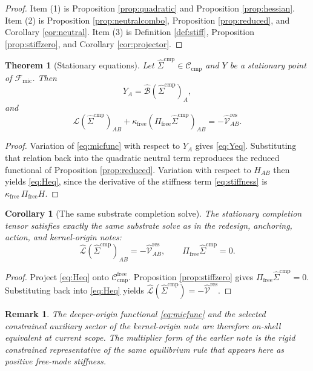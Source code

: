 \documentclass[11pt]{article}
\newcommand{\CompLift}{\widehat\Sigma^{\mathrm{cmp}}}
\newcommand{\ResidualLift}{\widehat{\mathcal V}^{\mathrm{res}}}
\newcommand{\SubGaugeVec}{\widehat{\mathcal B}}
\newcommand{\SubReducedEin}{\widehat{\mathcal L}}
\newcommand{\FreeProj}{\Pi_{\mathrm{free}}}
\newcommand{\GaugeAux}{Y}
\newcommand{\CompClass}{\mathscr C_{\mathrm{cmp}}}
\newcommand{\CompFree}{\mathscr C_{\mathrm{cmp}}^{\mathrm{free}}}
\newcommand{\MicFunctional}{\mathscr F_{\mathrm{mic}}}
\newcommand{\FreeStiff}{\kappa_{\mathrm{free}}}
\newtheorem{remark}{Remark}
\newtheorem{corollary}{Corollary}
\newtheorem{theorem}{Theorem}
\begin{document}
\begin{proof}
Item (1) is Proposition \ref{prop:quadratic} and Proposition \ref{prop:hessian}. Item (2) is Proposition \ref{prop:neutralcombo}, Proposition \ref{prop:reduced}, and Corollary \ref{cor:neutral}. Item (3) is Definition \ref{def:stiff}, Proposition \ref{prop:stiffzero}, and Corollary \ref{cor:projector}.
\end{proof}

\begin{theorem}[Stationary equations]
\label{thm:stationary}
Let \(\CompLift\in\CompClass\) and \(\GaugeAux\) be a stationary point of \(\MicFunctional\). Then
\begin{equation}
\GaugeAux_A=\SubGaugeVec(\CompLift)_A,
\label{eq:Yeq}
\end{equation}
and
\begin{equation}
\SubReducedEin(\CompLift)_{AB}
+\FreeStiff(\FreeProj\CompLift)_{AB}
=
-\ResidualLift_{AB}.
\label{eq:Heq}
\end{equation}
\end{theorem}

\begin{proof}
Variation of \eqref{eq:micfunc} with respect to \(\GaugeAux_A\) gives \eqref{eq:Yeq}. Substituting that relation back into the quadratic neutral term reproduces the reduced functional of Proposition \ref{prop:reduced}. Variation with respect to \(H_{AB}\) then yields \eqref{eq:Heq}, since the derivative of the stiffness term \eqref{eq:stiffness} is \(\FreeStiff\,\FreeProj H\).
\end{proof}

\begin{corollary}[The same substrate completion solve]
\label{cor:subsolve}
The stationary completion tensor satisfies exactly the same substrate solve as in the redesign, anchoring, action, and kernel-origin notes:
\begin{equation}
\SubReducedEin(\CompLift)_{AB}
=
-\ResidualLift_{AB},
\qquad
\FreeProj\CompLift=0.
\label{eq:subsolve}
\end{equation}
\end{corollary}

\begin{proof}
Project \eqref{eq:Heq} onto \(\CompFree\). Proposition \ref{prop:stiffzero} gives \(\FreeProj\CompLift=0\). Substituting back into \eqref{eq:Heq} yields \(\SubReducedEin(\CompLift)=-\ResidualLift\).
\end{proof}

\begin{remark}
The deeper-origin functional \eqref{eq:micfunc} and the selected constrained auxiliary sector of the kernel-origin note are therefore on-shell equivalent at current scope. The multiplier form of the earlier note is the rigid constrained representative of the same equilibrium rule that appears here as positive free-mode stiffness.
\end{remark}
\end{document}
